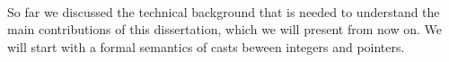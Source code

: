 


\paragraph*{}

So far we discussed the technical background that is needed to understand the main contributions of
this dissertation, which we will present from now on.  We will start with a formal semantics of
casts beween integers and pointers.


